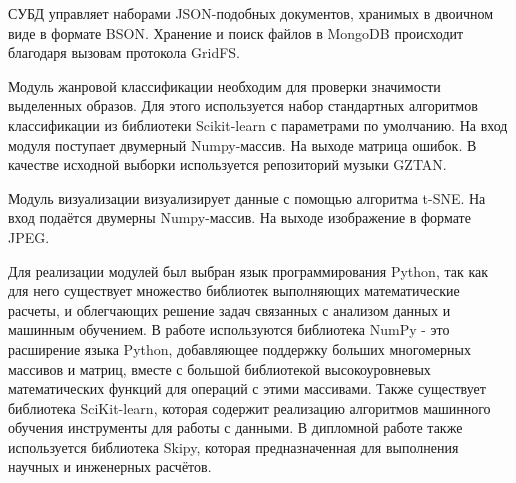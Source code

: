СУБД управляет наборами JSON-подобных документов, хранимых в двоичном виде в формате BSON. Хранение и поиск файлов в MongoDB происходит благодаря вызовам протокола GridFS.

Модуль жанровой классификации необходим для проверки значимости выделенных образов. Для этого используется набор стандартных алгоритмов классификации из библиотеки Scikit-learn с параметрами по умолчанию. На вход модуля поступает двумерный Numpy-массив. На выходе матрица ошибок. В качестве исходной выборки используется репозиторий музыки GZTAN.

Модуль визуализации визуализирует данные с помощью алгоритма t-SNE. На вход подаётся двумерны Numpy-массив. На выходе изображение в формате JPEG.

Для реализации модулей был выбран язык программирования Python, так как для него существует множество библиотек выполняющих математические расчеты, и облегчающих решение задач связанных с анализом данных и машинным обучением. В работе используются библиотека NumPy - это расширение языка Python, добавляющее поддержку больших многомерных массивов и матриц, вместе с большой библиотекой высокоуровневых математических функций для операций с этими массивами. Также существует библиотека SciKit-learn, которая содержит реализацию алгоритмов машинного обучения инструменты для работы с данными. В дипломной работе также используется библиотека Skipy, которая предназначенная для выполнения научных и инженерных расчётов.
